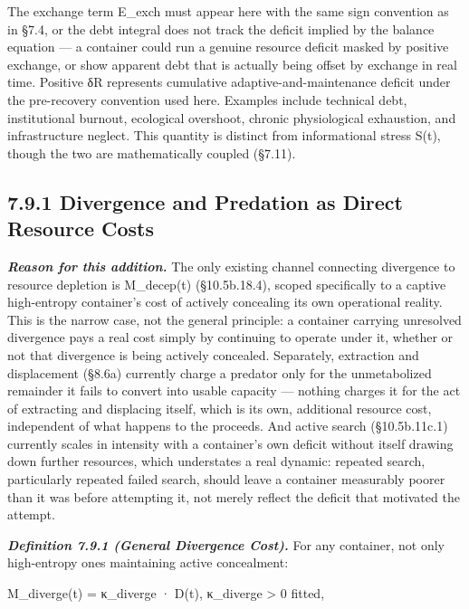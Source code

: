 \documentclass[
]{article}
\begin{document}
The exchange term E\_exch must appear here with the same sign convention
as in §7.4, or the debt integral does not track the deficit implied by
the balance equation --- a container could run a genuine resource
deficit masked by positive exchange, or show apparent debt that is
actually being offset by exchange in real time. Positive δR represents
cumulative adaptive-and-maintenance deficit under the pre-recovery
convention used here. Examples include technical debt, institutional
burnout, ecological overshoot, chronic physiological exhaustion, and
infrastructure neglect. This quantity is distinct from informational
stress S(t), though the two are mathematically coupled (§7.11).

\hypertarget{divergence-and-predation-as-direct-resource-costs}{%
\subsection{7.9.1 Divergence and Predation as Direct Resource
Costs}\label{divergence-and-predation-as-direct-resource-costs}}

\emph{\textbf{Reason for this addition.}} The only existing channel
connecting divergence to resource depletion is M\_decep(t)
(§10.5b.18.4), scoped specifically to a captive high-entropy container's
cost of actively concealing its own operational reality. This is the
narrow case, not the general principle: a container carrying unresolved
divergence pays a real cost simply by continuing to operate under it,
whether or not that divergence is being actively concealed. Separately,
extraction and displacement (§8.6a) currently charge a predator only for
the unmetabolized remainder it fails to convert into usable capacity ---
nothing charges it for the act of extracting and displacing itself,
which is its own, additional resource cost, independent of what happens
to the proceeds. And active search (§10.5b.11c.1) currently scales in
intensity with a container's own deficit without itself drawing down
further resources, which understates a real dynamic: repeated search,
particularly repeated failed search, should leave a container measurably
poorer than it was before attempting it, not merely reflect the deficit
that motivated the attempt.

\emph{\textbf{Definition 7.9.1 (General Divergence Cost).}} For any
container, not only high-entropy ones maintaining active concealment:

M\_diverge(t) = κ\_diverge · D(t), κ\_diverge \textgreater{} 0 fitted,
\end{document}
